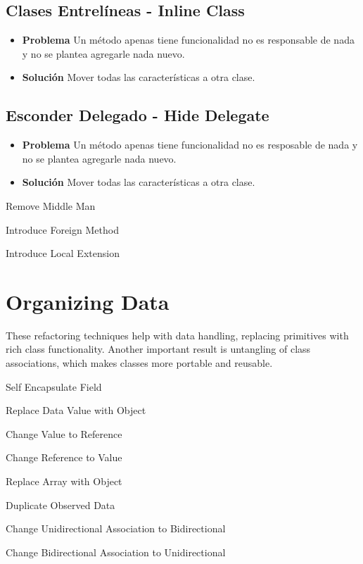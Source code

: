 \documentclass[11pt,a4paper,oneside]{book}
\begin{document}
\subsection{Clases Entrelíneas - Inline Class}
\begin{itemize}
    \item \textbf{Problema} Un método apenas tiene funcionalidad no es responsable de nada y no se plantea agregarle nada nuevo.
    \item \textbf{Solución} Mover todas las características a otra clase.
\end{itemize}
    
\subsection{Esconder Delegado - Hide Delegate}
 \begin{itemize}
    \item \textbf{Problema} Un método apenas tiene funcionalidad no es resposable de nada y no se plantea agregarle nada nuevo.
    \item \textbf{Solución} Mover todas las características a otra clase.
\end{itemize}

    Remove Middle Man
    
    Introduce Foreign Method
    
    Introduce Local Extension



\section{Organizing Data}

These refactoring techniques help with data handling, replacing primitives with rich class functionality. Another important result is untangling of class associations, which makes classes more portable and reusable.

    Self Encapsulate Field
    
    Replace Data Value with Object
    
    Change Value to Reference
    
    Change Reference to Value
    
    Replace Array with Object
    
    Duplicate Observed Data
    
    Change Unidirectional Association to Bidirectional
    
    Change Bidirectional Association to Unidirectional
    
\end{document}
